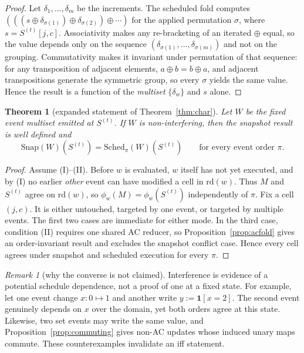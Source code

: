 \documentclass[sigconf,nonacm,review,natbib=true]{acmart}
\newtheorem{theorem}{Theorem}
\theoremstyle{definition}
\theoremstyle{plain}
\theoremstyle{remark}
\newtheorem{remark}{Remark}
\begin{document}
\begin{proof} Let $\delta_1,\dots,\delta_m$ be the increments. The scheduled fold computes $(((s\oplus\delta_{\sigma(1)})\oplus\delta_{\sigma(2)})\oplus\cdots)$ for the applied permutation $\sigma$, where $s=S^{(t)}[j,c]$. Associativity makes any re-bracketing of an iterated $\oplus$ equal, so the value depends only on the sequence $(\delta_{\sigma(1)},\dots,\delta_{\sigma(m)})$ and not on the grouping. Commutativity makes it invariant under permutation of that sequence: for any transposition of adjacent elements, $a\oplus b=b\oplus a$, and adjacent transpositions generate the symmetric group, so every $\sigma$ yields the same value. Hence the result is a function of the \emph{multiset} $\{\delta_w\}$ and $s$ alone. \end{proof}
\begin{theorem}[expanded statement of Theorem~\ref{thm:char}]\label{thm:char-full}
Let $W$ be the fixed event multiset emitted at $S^{(t)}$. If $W$ is
non-interfering, then the snapshot result is well defined and
\[
\mathrm{Snap}(W)(S^{(t)})=
\mathrm{Sched}_\pi(W)(S^{(t)})
\qquad\text{for every event order }\pi .
\]
\end{theorem}

\begin{proof} Assume (I)--(II). Before $w$ is evaluated, $w$ itself has not yet
executed, and by (I) no earlier \emph{other} event can have modified a cell in
$\mathrm{rd}(w)$. Thus $M$ and $S^{(t)}$ agree on $\mathrm{rd}(w)$, so
$\phi_w(M)=\phi_w(S^{(t)})$ independently of $\pi$. Fix a cell $(j,c)$. It is
either untouched, targeted by one event, or targeted by multiple events. The
first two cases are immediate for either mode. In the third case, condition
(II) requires one shared AC reducer, so Proposition~\ref{prop:acfold} gives an
order-invariant result and excludes the snapshot conflict case. Hence every
cell agrees under snapshot and scheduled execution for every $\pi$.
\end{proof}

\begin{remark}[why the converse is not claimed]
Interference is evidence of a potential schedule dependence, not a proof of one
at a fixed state. For example, let one event change $x:0\mapsto1$ and another
write $y:=\mathbf 1[x=2]$. The second event genuinely depends on $x$ over the
domain, yet both orders agree at this state. Likewise, two set events may write
the same value, and Proposition~\ref{prop:commuting} gives non-AC updates whose
induced unary maps commute. These counterexamples invalidate an iff statement.
\end{remark}
 
\end{document}
